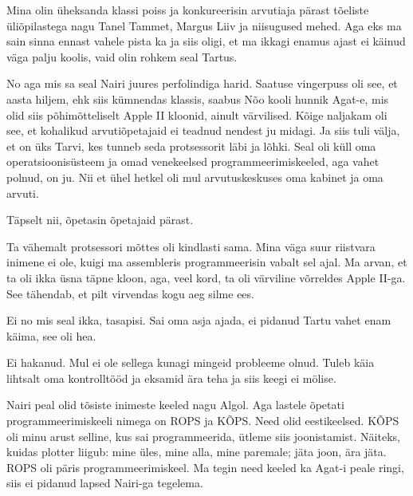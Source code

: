 Mina olin üheksanda klassi poiss ja konkureerisin  arvutiaja pärast tõeliste üliõpilastega nagu Tanel Tammet, Margus Liiv ja niisugused mehed. Aga eks ma sain sinna ennast vahele pista ka ja siis oligi, et ma ikkagi enamus ajast ei käinud väga palju koolis, vaid olin rohkem seal Tartus.


No aga mis sa seal Nairi juures perfolindiga harid. Saatuse vingerpuss oli see, et aasta hiljem, ehk siis kümnendas klassis, saabus Nõo kooli hunnik Agat-e, mis olid siis põhimõtteliselt Apple II  kloonid,  ainult värvilised. Kõige naljakam oli see, et  kohalikud arvutiõpetajaid  ei teadnud nendest ju midagi. Ja siis tuli välja, et on üks Tarvi, kes tunneb seda protsessorit  läbi ja lõhki. Seal oli küll oma operatsioonisüsteem ja omad venekeelsed programmeerimiskeeled, aga vahet polnud, on ju. Nii et ühel hetkel oli mul arvutuskeskuses oma  kabinet ja oma arvuti. 


Täpselt nii, õpetasin õpetajaid pärast. 


Ta vähemalt protsessori mõttes oli kindlasti sama. Mina väga suur riistvara inimene ei ole,  kuigi ma assembleris programmeerisin vabalt sel ajal. Ma arvan, et ta oli ikka üsna täpne kloon, aga, veel kord, ta oli värviline võrreldes Apple II-ga. See tähendab, et pilt virvendas kogu aeg silme ees.  


Ei no mis seal ikka,  tasapisi. Sai  oma asja ajada, ei pidanud Tartu vahet enam käima, see oli hea.


Ei hakanud. Mul ei ole sellega kunagi mingeid probleeme olnud. Tuleb käia lihtsalt oma kontrolltööd ja eksamid ära teha ja siis keegi ei mölise.

Nairi peal olid tõsiste inimeste keeled nagu Algol. Aga lastele õpetati programmeerimiskeeli nimega on ROPS ja KÕPS. Need olid eestikeelsed. KÕPS oli minu arust selline, kus sai programmeerida, ütleme siis joonistamist. Näiteks, kuidas plotter liigub: mine üles, mine alla, mine paremale; jäta joon, ära jäta.  ROPS oli päris programmeerimiskeel. Ma tegin need keeled ka Agat-i peale ringi, siis ei pidanud lapsed Nairi-ga tegelema. 

